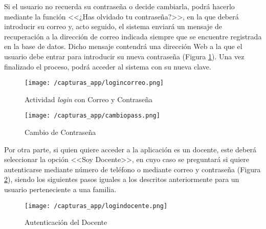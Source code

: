 \clearpage

Si el usuario no recuerda su contraseña o decide cambiarla, podrá hacerlo mediante la función <<¿Has olvidado tu contraseña?>>, en la que deberá introducir su correo y, acto seguido, el sistema enviará un mensaje de recuperación a la dirección de correo indicada siempre que se encuentre registrada en la base de datos. Dicho mensaje contendrá una dirección Web a la que el usuario debe entrar para introducir su nueva contraseña (Figura \ref{fig:cambiopass}). Una vez finalizado el proceso, podrá acceder al sistema con su nueva clave.

\begin{figure}[!h]
	\centering
	\begin{minipage}{.5\textwidth}
		\centering
		\texttt{[image: /capturas\_app/logincorreo.png]}
		\caption{Actividad \textit{login} con Correo y Contraseña}
		\label{fig:logincorreo}
	\end{minipage}%
	\begin{minipage}{.5\textwidth}
		\centering
		\texttt{[image: /capturas\_app/cambiopass.png]}
		\caption{Cambio de Contraseña}
		\label{fig:cambiopass}
	\end{minipage}
\end{figure}

\clearpage

Por otra parte, si quien quiere acceder a la aplicación es un docente, este deberá seleccionar la opción <<Soy Docente>>, en cuyo caso se preguntará si quiere autenticarse mediante número de teléfono o mediante correo y contraseña (Figura \ref{fig:logindocente}), siendo los siguientes pasos iguales a los descritos anteriormente para un usuario perteneciente a una familia.

\begin{figure}[!h]
	\begin{center}
		\texttt{[image: /capturas\_app/logindocente.png]}
		\caption{Autenticación del Docente}
		\label{fig:logindocente}
	\end{center}
\end{figure}

